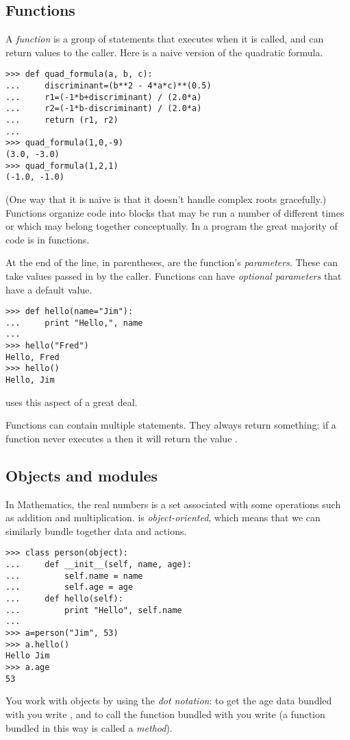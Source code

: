 \subsection{Functions}
A \textit{function} is a group of statements that executes when it is called,
and can return values to the caller.
Here is a naive version of the quadratic formula.
\begin{lstlisting}[style=python]
>>> def quad_formula(a, b, c):
...     discriminant=(b**2 - 4*a*c)**(0.5)
...     r1=(-1*b+discriminant) / (2.0*a)
...     r2=(-1*b-discriminant) / (2.0*a)
...     return (r1, r2)
... 
>>> quad_formula(1,0,-9)
(3.0, -3.0)
>>> quad_formula(1,2,1)
(-1.0, -1.0)
\end{lstlisting}
(One way that it is naive is that it doesn't handle complex roots gracefully.)
Functions organize code into blocks that may be 
run a number of different times or which may belong together conceptually. 
In a \python{} program the great majority of code is in functions. 

At the end of the  line, in parentheses, are
the function's \textit{parameters}. 
These can take values 
passed in by the caller.
Functions can have \textit{optional parameters} that have a default value.
\begin{lstlisting}[style=python]
>>> def hello(name="Jim"):
...     print "Hello,", name
... 
>>> hello("Fred")
Hello, Fred
>>> hello()
Hello, Jim  
\end{lstlisting}
\Sage{} uses this aspect of \python{} a great deal.

Functions can contain multiple  statements.
They always return something; 
if a function never executes a  then it will
return the value .




\subsection{Objects and modules}
In Mathematics, the real numbers is a set associated with some operations
such as addition and multiplication.
\python{} is \textit{object-oriented}, which means that we can similarly bundle
together data and actions.
\begin{lstlisting}[style=python]
>>> class person(object):
...     def __init__(self, name, age):
...         self.name = name
...         self.age = age
...     def hello(self):
...         print "Hello", self.name
... 
>>> a=person("Jim", 53)
>>> a.hello()
Hello Jim
>>> a.age
53  
\end{lstlisting}
You work with objects by using the \textit{dot notation}:
to get the age data bundled with 
you write , and to 
call the  function bundled
with  you write
(a function bundled in this way is called a \textit{method}).

